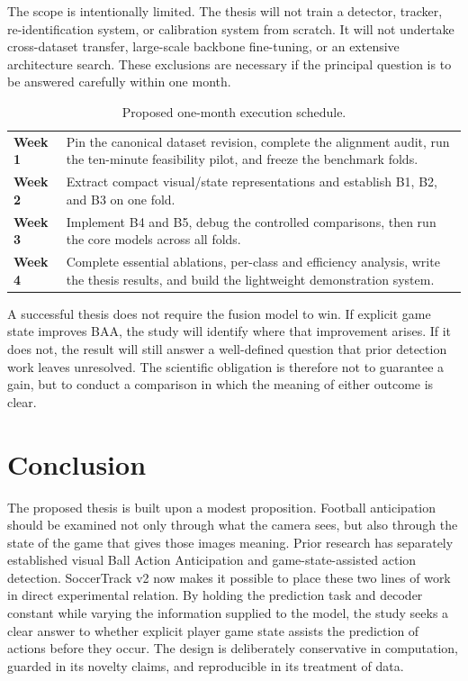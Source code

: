 \documentclass[11pt,a4paper]{article}
\begin{document}
The scope is intentionally limited. The thesis will not train a detector, tracker, re-identification system, or calibration system from scratch. It will not undertake cross-dataset transfer, large-scale backbone fine-tuning, or an extensive architecture search. These exclusions are necessary if the principal question is to be answered carefully within one month.

\begin{table}[H]
\centering
\small
\begin{tabularx}{\textwidth}{>{\bfseries}p{1.2cm} X}
\toprule
Week 1 & Pin the canonical dataset revision, complete the alignment audit, run the ten-minute feasibility pilot, and freeze the benchmark folds.\\
Week 2 & Extract compact visual/state representations and establish B1, B2, and B3 on one fold.\\
Week 3 & Implement B4 and B5, debug the controlled comparisons, then run the core models across all folds.\\
Week 4 & Complete essential ablations, per-class and efficiency analysis, write the thesis results, and build the lightweight demonstration system.\\
\bottomrule
\end{tabularx}
\caption{Proposed one-month execution schedule.}
\end{table}

A successful thesis does not require the fusion model to win. If explicit game state improves BAA, the study will identify where that improvement arises. If it does not, the result will still answer a well-defined question that prior detection work leaves unresolved. The scientific obligation is therefore not to guarantee a gain, but to conduct a comparison in which the meaning of either outcome is clear.

\section{Conclusion}

The proposed thesis is built upon a modest proposition. Football anticipation should be examined not only through what the camera sees, but also through the state of the game that gives those images meaning. Prior research has separately established visual Ball Action Anticipation and game-state-assisted action detection. SoccerTrack v2 now makes it possible to place these two lines of work in direct experimental relation. By holding the prediction task and decoder constant while varying the information supplied to the model, the study seeks a clear answer to whether explicit player game state assists the prediction of actions before they occur. The design is deliberately conservative in computation, guarded in its novelty claims, and reproducible in its treatment of data.
\end{document}
